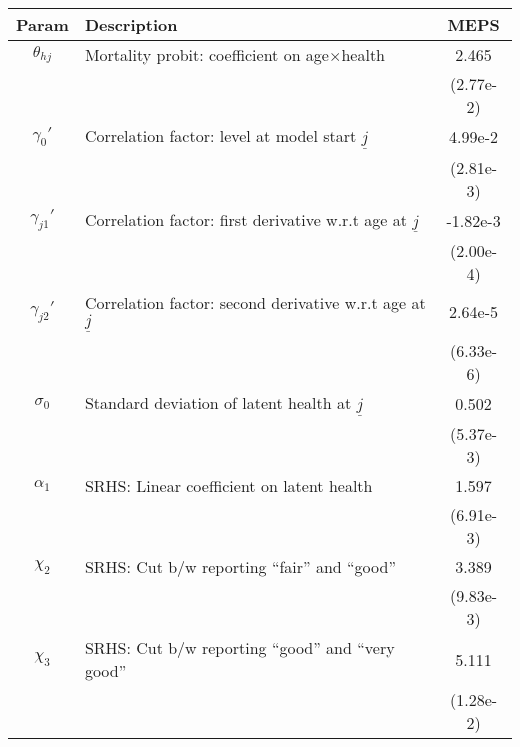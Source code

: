 \begin{table}[ht]\label{MEPSwomenOtherParams}
\footnotesize
\begin{center}
\begin{tabular}{clc}
\hline \hline
Param & Description & MEPS \\
\hline
$\theta_{hj}$ & Mortality probit: coefficient on age$\times$health & 2.465 \\
 & & (2.77e-2) \\
$\gamma_{0}'$ & Correlation factor: level at model start $\underline{j}$ & 4.99e-2 \\
 & & (2.81e-3) \\
$\gamma_{j1}'$ & Correlation factor: first derivative w.r.t age at $\underline{j}$ & -1.82e-3 \\
 & & (2.00e-4) \\
$\gamma_{j2}'$ & Correlation factor: second derivative w.r.t age at $\underline{j}$ & 2.64e-5 \\
 & & (6.33e-6) \\
$\sigma_{0}$ & Standard deviation of latent health at $\underline{j}$ & 0.502 \\
 & & (5.37e-3) \\
$\alpha_1$ & SRHS: Linear coefficient on latent health & 1.597 \\
 & & (6.91e-3) \\
$\chi_2$ & SRHS: Cut b/w reporting ``fair'' and ``good'' & 3.389 \\
 & & (9.83e-3) \\
$\chi_3$ & SRHS: Cut b/w reporting ``good'' and ``very good'' & 5.111 \\
 & & (1.28e-2) \\
\hline\hline
\end{tabular}
\end{center}
\end{table}
